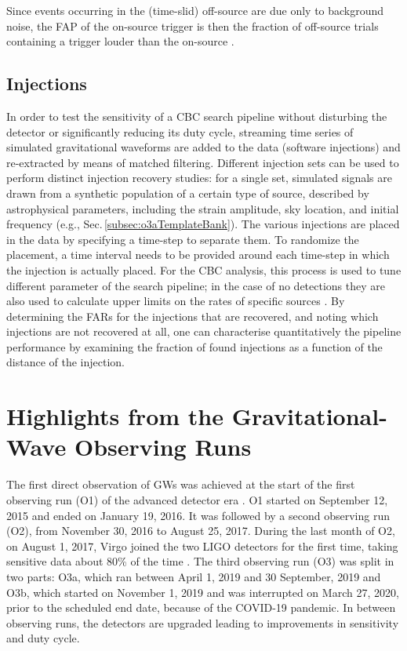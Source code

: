 \documentclass[binding=0.6cm, LaM]{sapthesis}
\begin{document}
 	Since events occurring in the (time-slid) off-source are due only to background noise,
	the FAP of the on-source trigger is then the fraction of off-source trials containing a trigger louder than the on-source \cite{46}.

\section{Injections}
\label{sec:injections}
	In order to test the sensitivity of a CBC search pipeline without disturbing the detector or significantly reducing its duty cycle,
        streaming time series of simulated gravitational waveforms are added to the data (software injections)
        and re-extracted by means of matched filtering.
        Different injection sets can be used to perform distinct injection recovery studies:
        for a single set, simulated signals are drawn from a synthetic population of a certain type of source,
        described by astrophysical parameters, including the strain amplitude, sky location,
        and initial frequency \cite{30} (e.g., Sec.\,\ref{subsec:o3aTemplateBank}).
        The various injections are placed in the data by specifying a time-step to separate them.
        To randomize the placement, a time interval needs to be provided around
        each time-step in which the injection is actually placed.
        For the CBC analysis, this process is used to tune different parameter of the search pipeline;
        in the case of no detections they are also used to calculate upper limits on the rates of specific sources \cite{47}.
        By determining the FARs for the injections that are recovered,
        and noting which injections are not recovered at all,
        one can characterise quantitatively the pipeline performance \cite{47, 48}
        by examining the fraction of found injections as a function of the distance of the injection.

	
\chapter{Highlights from the Gravitational-Wave Observing Runs}
\label{ch:ObservingRuns}
	The first direct observation of GWs was achieved at the start of the first observing run (O1) 
	of the advanced detector era \cite{52}.
	O1 started on September 12, 2015 and ended on January 19, 2016.
	It was followed by a second observing run (O2), 
	from November 30, 2016 to August 25, 2017.
	During the last month of O2, on August 1, 2017, Virgo joined the two LIGO detectors for the first time, 	
	taking sensitive data about 80\% of the time \cite{13}.
	The third observing run (O3) was split in two parts: O3a, which ran between April 1, 2019 and 30 September, 2019 and O3b, 
	which started on November 1, 2019 and was interrupted on March 27, 2020, prior to the scheduled end date, 
	because of the COVID-19 pandemic.
	In between observing runs, the detectors are upgraded leading to improvements in sensitivity and duty cycle.
\end{document}
